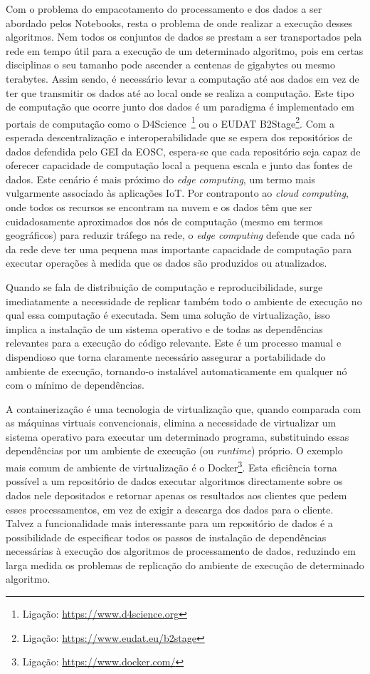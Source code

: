 \documentclass[sigconf,nonacm]{acmart}
\begin{document}
Com o problema do empacotamento do processamento e dos dados a ser abordado pelos Notebooks, resta o problema de onde realizar a execução desses algoritmos. Nem todos os conjuntos de dados se prestam a ser transportados pela rede em tempo útil para a execução de um determinado algoritmo, pois em certas disciplinas o seu tamanho pode ascender a centenas de gigabytes ou mesmo terabytes. Assim sendo, é necessário levar a computação até aos dados em vez de ter que transmitir os dados até ao local onde se realiza a computação. Este tipo de computação que ocorre junto dos dados é um paradigma é implementado em portais de computação como o D4Science~\footnote{Ligação: \url{https://www.d4science.org}} ou o EUDAT B2Stage\footnote{Ligação: \url{https://www.eudat.eu/b2stage}}. Com a esperada descentralização e interoperabilidade que se espera dos repositórios de dados defendida pelo GEI da EOSC, espera-se que cada repositório seja capaz de oferecer capacidade de computação local a pequena escala e junto das fontes de dados. Este cenário é mais próximo do \emph{edge computing}, um termo mais vulgarmente associado às aplicações IoT. Por contraponto ao \emph{cloud computing}, onde todos os recursos se encontram na nuvem e os dados têm que ser cuidadosamente aproximados dos nós de computação (mesmo em termos geográficos) para reduzir tráfego na rede, o \emph{edge computing} defende que cada nó da rede deve ter uma pequena mas importante capacidade de computação para executar operações à medida que os dados são produzidos ou atualizados. 

Quando se fala de distribuição de computação e reproducibilidade, surge imediatamente a necessidade de replicar também todo o ambiente de execução no qual essa computação é executada. Sem uma solução de virtualização, isso implica a instalação de um sistema operativo e de todas as dependências relevantes para a execução do código relevante. Este é um processo manual e dispendioso que torna claramente necessário assegurar a portabilidade do ambiente de execução, tornando-o instalável automaticamente em qualquer nó com o mínimo de dependências. 

A containerização é uma tecnologia de virtualização que, quando comparada com as máquinas virtuais convencionais, elimina a necessidade de virtualizar um sistema operativo para executar um determinado programa, substituindo essas dependências por um ambiente de execução (ou \textit{runtime}) próprio. O exemplo mais comum de ambiente de virtualização é o Docker\footnote{Ligação: \url{https://www.docker.com/}}. Esta eficiência torna possível a um repositório de dados executar algoritmos directamente sobre os dados nele depositados e retornar apenas os resultados aos clientes que pedem esses processamentos, em vez de exigir a descarga dos dados para o cliente. Talvez a funcionalidade mais interessante para um repositório de dados é a possibilidade de especificar todos os passos de instalação de dependências necessárias à execução dos algoritmos de processamento de dados, reduzindo em larga medida os problemas de replicação do ambiente de execução de determinado algoritmo.
\end{document}
